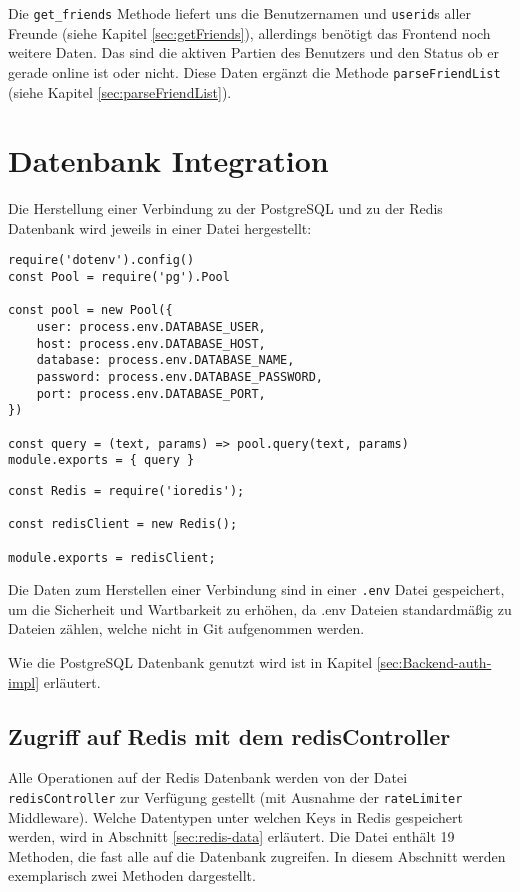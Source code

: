 Die \verb|get_friends| Methode liefert uns die Benutzernamen und \verb|userid|s aller Freunde (siehe Kapitel \ref{sec:getFriends}), allerdings benötigt das Frontend noch weitere Daten. Das sind die aktiven Partien des Benutzers und den Status ob er gerade online ist oder nicht. Diese Daten ergänzt die Methode \verb|parseFriendList| (siehe Kapitel \ref{sec:parseFriendList}).


\section{Datenbank Integration}
\label{sec:Datenbank-Integration}
Die Herstellung einer Verbindung zu der PostgreSQL und zu der Redis Datenbank wird jeweils in einer Datei hergestellt:

\begin{lstlisting}[style=codeStyle, caption={Initialisierung der PostgreSQL Datenbank und einer Methode für die Anfragen}, label={lst:pg-pool}]
require('dotenv').config()
const Pool = require('pg').Pool

const pool = new Pool({
    user: process.env.DATABASE_USER,
    host: process.env.DATABASE_HOST,
    database: process.env.DATABASE_NAME,
    password: process.env.DATABASE_PASSWORD,
    port: process.env.DATABASE_PORT,
})

const query = (text, params) => pool.query(text, params)
module.exports = { query }  
\end{lstlisting}

\begin{lstlisting}[style=codeStyle, caption={Initialisierung einer Redis-Datebank Verbindung}, label={lst:redisClient}]
const Redis = require('ioredis');

const redisClient = new Redis();

module.exports = redisClient;
\end{lstlisting}

Die Daten zum Herstellen einer Verbindung sind in einer \verb|.env| Datei gespeichert, um die Sicherheit und Wartbarkeit zu erhöhen, da .env Dateien standardmäßig zu Dateien zählen, welche nicht in Git aufgenommen werden.

Wie die PostgreSQL Datenbank genutzt wird ist in Kapitel \ref{sec:Backend-auth-impl} erläutert. 

\subsection{Zugriff auf Redis mit dem redisController}
Alle Operationen auf der Redis Datenbank werden von der Datei \verb|redisController| zur Verfügung gestellt (mit Ausnahme der \verb|rateLimiter| Middleware). Welche Datentypen unter welchen Keys in Redis gespeichert werden, wird in Abschnitt \ref{sec:redis-data} erläutert.
Die Datei enthält 19 Methoden, die fast alle auf die Datenbank zugreifen. In diesem Abschnitt werden exemplarisch zwei Methoden dargestellt.

